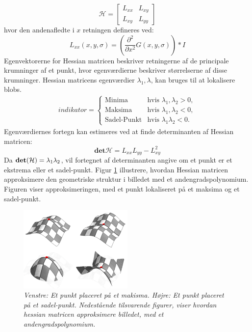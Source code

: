 \begin{equation}
\mathcal{H} = 
 \begin{bmatrix}
 	L_{xx} & L_{xy} \\
 	L_{xy} & L_{yy}
 \end{bmatrix}
 \label{hessianmatrixblob}
\end{equation}
hvor den andenafledte i $x$ retningen defineres ved:
\begin{equation}
L_{xx}(x,y,\sigma) = (\frac{\partial^2 }{\partial x^2 } G(x,y,\sigma)) * I
\label{lxx}
\end{equation}
Egenvektorerne for Hessian matricen beskriver retningerne af de principale krumninger af et punkt, hvor egenværdierne beskriver størrelserne af disse krumninger. Hessian matricens egenværdier $\lambda_1,\lambda$, kan bruges til at lokalisere blobs.
\begin{equation}
\begin{split}
indikator = 
\begin{cases}
\text{Minima} & \text{hvis } \lambda_1, \lambda_2 > 0, \\
\text{Maksima}& \text{hvis } \lambda_1, \lambda_2 < 0,  \\
\text{Sadel-Punkt} & \text{hvis } \lambda_1 \lambda_2 < 0.
\end{cases}
\end{split}
\label{maxsurp}
\end{equation}
Egenværdiernes fortegn kan estimeres ved  at finde determinanten af Hessian matricen:
\begin{equation}
\textbf{det}\mathcal{H} = L_{xx}L_{yy}-L_{xy}^2
\label{detofhessian}
\end{equation}
Da $\bold{det}(\mathcal{H})=\lambda_1 \lambda_2$, vil fortegnet af determinanten angive om et punkt er et ekstrema eller et sadel-punkt. Figur \ref{fig:makssad} illustrere, hvordan Hessian matricen approksimere den geometriske struktur i billedet med et andengradspolynomium. Figuren viser approksimeringen, med et punkt lokaliseret på et maksima og et sadel-punkt.
\begin{figure}[H]
    \centering
    \includegraphics[width=0.50\textwidth]{fig/41.png}
    \vspace{-0.5em}
    \begin{center}
    \caption{{\footnotesize \textit{Venstre: Et punkt placeret på et makisma. Højre: Et punkt placeret på et sadel-punkt. Nedestående tilsvarende figurer, viser hvordan hessian matricen approksimere billedet, med et andengradspolynomium. 
}}}
    \label{fig:makssad}
     \end{center}
  \end{figure}
